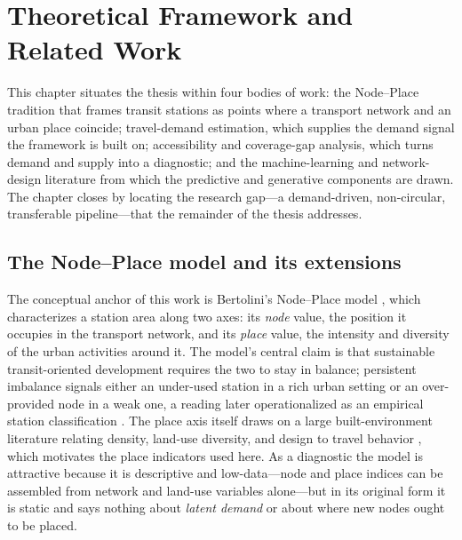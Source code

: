 \chapter{Theoretical Framework and Related Work}
\label{ch:literature}

This chapter situates the thesis within four bodies of work: the Node--Place tradition
that frames transit stations as points where a transport network and an urban place
coincide; travel-demand estimation, which supplies the demand signal the framework is
built on; accessibility and coverage-gap analysis, which turns demand and supply into a
diagnostic; and the machine-learning and network-design literature from which the
predictive and generative components are drawn. The chapter closes by locating the
research gap---a demand-driven, non-circular, transferable pipeline---that the remainder
of the thesis addresses.

\section{The Node--Place model and its extensions}
\label{sec:lit-nodeplace}

The conceptual anchor of this work is Bertolini's Node--Place model
\parencite{bertolini1996, bertolini1999}, which characterizes a station area along two
axes: its \emph{node} value, the position it occupies in the transport network, and its
\emph{place} value, the intensity and diversity of the urban activities around it. The
model's central claim is that sustainable transit-oriented development requires the two
to stay in balance; persistent imbalance signals either an under-used station in a rich
urban setting or an over-provided node in a weak one, a reading later operationalized as
an empirical station classification \parencite{reusser2008, vale2015}. The place axis
itself draws on a large built-environment literature relating density, land-use
diversity, and design to travel behavior \parencite{cervero1997threeD, ewing2010meta},
which motivates the place indicators used here. As a diagnostic the model is attractive
because it is descriptive and low-data---node and place indices can be assembled from
network and land-use variables alone---but in its original form it is static and says
nothing about \emph{latent demand} or about where new nodes ought to be placed.

